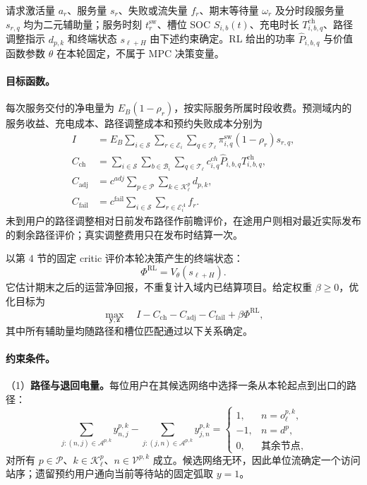 \documentclass[12pt,a4paper,UTF8]{ctexart}
\begin{document}
请求激活量 $a_r$、服务量 $s_r$、失败或流失量 $f_r$、期末等待量 $\omega_r$ 及分时段服务量 $s_{r,q}$ 均为二元辅助量；服务时刻 $t_r^{\mathrm{sw}}$、槽位 SOC $S_{i,b}(t)$、充电时长 $T_{i,b,q}^{\mathrm{ch}}$、路径调整指示 $d_{p,k}$ 和终端状态 $s_{\ell+H}$ 由下述约束确定。RL 给出的功率 $\widehat P_{i,b,q}$ 与价值函数参数 $\theta$ 在本轮固定，不属于 MPC 决策变量。

\paragraph{目标函数。}
每次服务交付的净电量为 $E_B(1-\rho_r)$，按实际服务所属时段收费。预测域内的服务收益、充电成本、路径调整成本和预约失败成本分别为
\begin{align}
I&=E_B\sum_{i\in\mathcal S}\sum_{r\in\mathcal E_i}
\sum_{q\in\mathcal T_\ell}\pi_{i,q}^{\mathrm{sw}}(1-\rho_r)s_{r,q},
\label{eq:income}\\
C_{\mathrm{ch}}&=\sum_{i\in\mathcal S}\sum_{b\in\mathcal B_i}
\sum_{q\in\mathcal T_\ell}c^{ch}_{i,q}\widehat P_{i,b,q}T_{i,b,q}^{\mathrm{ch}},
\label{eq:chargingcost}\\
C_{\mathrm{adj}}&=c^{adj}\sum_{p\in\mathcal P}\sum_{k\in\mathcal K_\ell^p}d_{p,k},
\label{eq:adjustment_cost}\\
C_{\mathrm{fail}}&=c^{\mathrm{fail}}\sum_{i\in\mathcal S}\sum_{r\in\mathcal E_i^A}f_r.
\label{eq:reservation_failure_cost}
\end{align}
未到用户的路径调整相对日前发布路径作前瞻评价，在途用户则相对最近实际发布的剩余路径评价；真实调整费用只在发布时结算一次。

以第 4 节的固定 critic 评价本轮决策产生的终端状态：
\begin{equation}
\Phi^{\mathrm{RL}}=V_\theta(s_{\ell+H}).
\label{eq:rl_terminal_value}
\end{equation}
它估计期末之后的运营净回报，不重复计入域内已结算项目。给定权重 $\beta\ge0$，优化目标为
\begin{equation}
\max_{\mathbf y,\mathbf z}\quad
I-C_{\mathrm{ch}}-C_{\mathrm{adj}}-C_{\mathrm{fail}}+\beta\Phi^{\mathrm{RL}},
\label{eq:objective}
\end{equation}
其中所有辅助量均随路径和槽位匹配通过以下关系确定。

\paragraph{约束条件。}
（1）\textbf{路径与退回电量。}每位用户在其候选网络中选择一条从本轮起点到出口的路径：
\begin{equation}
\sum_{j:(n,j)\in\mathcal A^{p,k}}y_{n,j}^{p,k}
-\sum_{j:(j,n)\in\mathcal A^{p,k}}y_{j,n}^{p,k}
=\begin{cases}
1,&n=o_\ell^{p,k},\\
-1,&n=d^p,\\
0,&\text{其余节点},
\end{cases}
\label{eq:flow}
\end{equation}
对所有 $p\in\mathcal P$、$k\in\mathcal K_\ell^p$、$n\in\mathcal V^{p,k}$ 成立。候选网络无环，因此单位流确定一个访问站序；遗留预约用户通向当前等待站的固定弧取 $y=1$。
\end{document}
